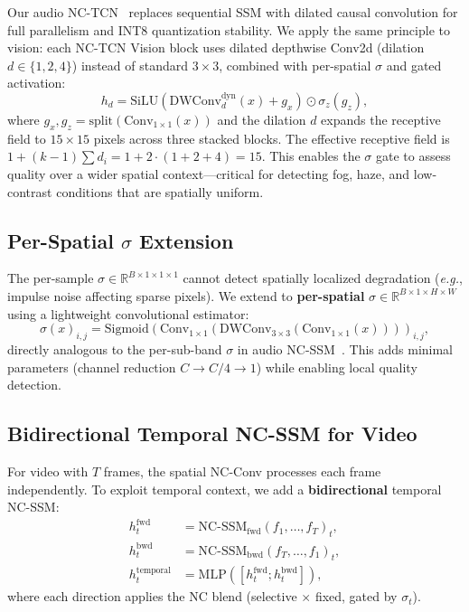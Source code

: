 \documentclass[runningheads]{llncs}
\newcommand{\eg}{\emph{e.g.}}
\begin{document}
Our audio NC-TCN~\cite{choi2026ncssm} replaces sequential SSM with dilated causal convolution for full parallelism and INT8 quantization stability.
We apply the same principle to vision: each NC-TCN Vision block uses dilated depthwise Conv2d (dilation $d \in \{1, 2, 4\}$) instead of standard $3{\times}3$, combined with per-spatial $\sigma$ and gated activation:
\begin{equation}
h_d = \text{SiLU}(\text{DWConv}_{d}^{\text{dyn}}(x) + g_x) \odot \sigma_z(g_z),
\end{equation}
where $g_x, g_z = \text{split}(\text{Conv}_{1{\times}1}(x))$ and the dilation $d$ expands the receptive field to $15{\times}15$ pixels across three stacked blocks.
The effective receptive field is $1 + (k{-}1)\sum d_i = 1 + 2 \cdot (1{+}2{+}4) = 15$.
This enables the $\sigma$ gate to assess quality over a wider spatial context---critical for detecting fog, haze, and low-contrast conditions that are spatially uniform.

\subsection{Per-Spatial $\sigma$ Extension}
\label{sec:spatial_sigma}

The per-sample $\sigma \in \mathbb{R}^{B \times 1 \times 1 \times 1}$ cannot detect spatially localized degradation (\eg, impulse noise affecting sparse pixels).
We extend to \textbf{per-spatial} $\sigma \in \mathbb{R}^{B \times 1 \times H \times W}$ using a lightweight convolutional estimator:
\begin{equation}
\sigma(x)_{i,j} = \text{Sigmoid}(\text{Conv}_{1\times1}(\text{DWConv}_{3\times3}(\text{Conv}_{1\times1}(x))))_{i,j},
\end{equation}
directly analogous to the per-sub-band $\sigma$ in audio NC-SSM~\cite{choi2026ncssm}.
This adds minimal parameters (channel reduction $C \to C/4 \to 1$) while enabling local quality detection.


\subsection{Bidirectional Temporal NC-SSM for Video}
\label{sec:temporal_theory}

For video with $T$ frames, the spatial NC-Conv processes each frame independently.
To exploit temporal context, we add a \textbf{bidirectional} temporal NC-SSM:
\begin{align}
h_t^{\text{fwd}} &= \text{NC-SSM}_{\text{fwd}}(f_1, \ldots, f_T)_t, \\
h_t^{\text{bwd}} &= \text{NC-SSM}_{\text{bwd}}(f_T, \ldots, f_1)_t, \\
h_t^{\text{temporal}} &= \text{MLP}([h_t^{\text{fwd}}; h_t^{\text{bwd}}]),
\end{align}
where each direction applies the NC blend (selective $\times$ fixed, gated by $\sigma_t$).
\end{document}
